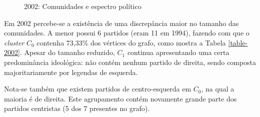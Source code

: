 \begin{figure}[H]
\center
    \qquad
    
    \caption{2002: Comunidades e espectro político}
\end{figure}

Em 2002 percebe-se a existência de uma discrepância maior no tamanho das comunidades. A menor possui 6 partidos (eram 11 em 1994), fazendo com que o \emph{cluster} $C_0$ contenha 73,33\% dos vértices do grafo, como mostra a Tabela \ref{table-2002}. Apesar do tamanho reduzido, $C_1$ continua apresentando uma certa predominância ideológica: não contém nenhum partido de direita, sendo composta majoritariamente por legendas de esquerda.

Nota-se também que existem partidos de centro-esquerda em $C_0$, na qual a maioria é de direita. Este agrupamento contém novamente grande parte dos partidos centristas (5 dos 7 presentes no grafo). 

